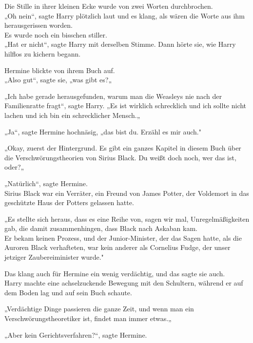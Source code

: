 {Die Stille in ihrer kleinen Ecke wurde von zwei Worten durchbrochen.\\ „Oh nein“, sagte Harry plötzlich laut und es klang, als wären die Worte aus ihm herausgerissen worden.\\ Es wurde noch ein bisschen stiller.\\ „Hat er nicht“, sagte Harry mit derselben Stimme. Dann hörte sie, wie Harry hilflos zu kichern begann.

Hermine blickte von ihrem Buch auf.\\ „Also gut“, sagte sie, „was gibt es?„

„Ich habe gerade herausgefunden, warum man die Weasleys nie nach der Familienratte fragt“, sagte Harry. „Es ist wirklich schrecklich und ich sollte nicht lachen und ich bin ein schrecklicher Mensch.„

„Ja“, sagte Hermine hochnäsig, „das bist du. Erzähl es mir auch."

„Okay, zuerst der Hintergrund. Es gibt ein ganzes Kapitel in diesem Buch über die Verschwörungstheorien von Sirius Black. Du weißt doch noch, wer das ist, oder?„

„Natürlich“, sagte Hermine.\\ Sirius Black war ein Verräter, ein Freund von James Potter, der Voldemort in das geschützte Haus der Potters gelassen hatte.

„Es stellte sich heraus, dass es eine Reihe von, sagen wir mal, Unregelmäßigkeiten gab, die damit zusammenhingen, dass Black nach Askaban kam.\\ Er bekam keinen Prozess, und der Junior-Minister, der das Sagen hatte, als die Auroren Black verhafteten, war kein anderer als Cornelius Fudge, der unser jetziger Zaubereiminister wurde."

Das klang auch für Hermine ein wenig verdächtig, und das sagte sie auch.\\ Harry machte eine achselzuckende Bewegung mit den Schultern, während er auf dem Boden lag und auf sein Buch schaute.

„Verdächtige Dinge passieren die ganze Zeit, und wenn man ein Verschwörungstheoretiker ist, findet man immer etwas.„

„Aber kein Gerichtsverfahren?“, sagte Hermine.

}
